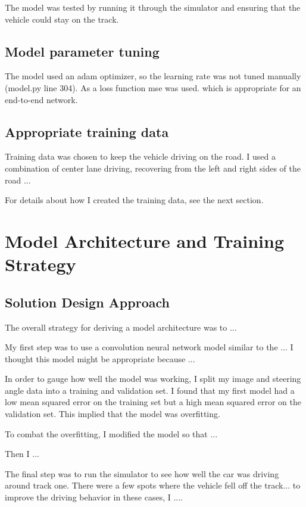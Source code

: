 \documentclass[a4paper, 11pt, DIV=14]{scrartcl}
\begin{document}
The model was tested by running it through the simulator and ensuring that the vehicle could stay on the track.

\subsection{Model parameter tuning}

The model used an adam optimizer, so the learning rate was not tuned manually (model.py line 304). As a loss function mse was used. which is appropriate for an end-to-end network.

\subsection{Appropriate training data}

Training data was chosen to keep the vehicle driving on the road. I used a combination of center lane driving, recovering from the left and right sides of the road ... 

For details about how I created the training data, see the next section. 

\section{Model Architecture and Training Strategy}

\subsection{Solution Design Approach}

The overall strategy for deriving a model architecture was to ...

My first step was to use a convolution neural network model similar to the ... I thought this model might be appropriate because ...

In order to gauge how well the model was working, I split my image and steering angle data into a training and validation set. I found that my first model had a low mean squared error on the training set but a high mean squared error on the validation set. This implied that the model was overfitting. 

To combat the overfitting, I modified the model so that ...

Then I ... 

The final step was to run the simulator to see how well the car was driving around track one. There were a few spots where the vehicle fell off the track... to improve the driving behavior in these cases, I ....
\end{document}
